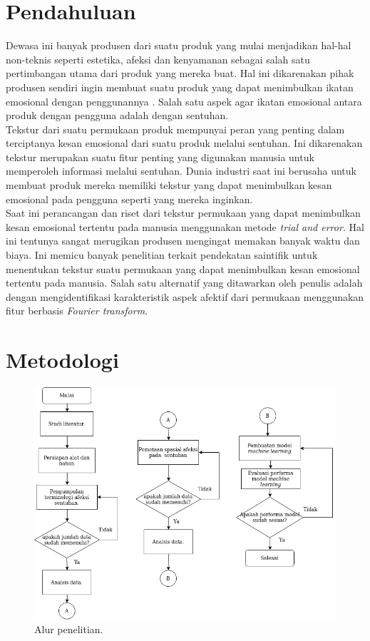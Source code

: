 \documentclass{Jurnal_kolo}
\begin{document}
\setlength{\columnsep}{1cm}
\begin{multicols}{2}
	\section{Pendahuluan}
	Dewasa ini banyak produsen dari suatu produk yang mulai menjadikan hal-hal non-teknis seperti estetika, afeksi dan kenyamanan sebagai salah satu pertimbangan utama dari produk yang mereka buat. Hal ini dikarenakan pihak produsen sendiri ingin membuat suatu produk yang dapat menimbulkan ikatan emosional dengan penggunannya \cite{Bahn2009}\cite{Khalid2006}. Salah satu aspek agar ikatan emosional antara produk dengan pengguna adalah dengan sentuhan.\\
	\indent Tekstur dari suatu permukaan produk mempunyai peran yang penting dalam terciptanya kesan emosional dari suatu produk melalui sentuhan. Ini dikarenakan tekstur merupakan suatu fitur penting yang digunakan manusia untuk memperoleh informasi melalui sentuhan. Dunia industri saat ini berusaha untuk membuat produk mereka memiliki tekstur yang dapat menimbulkan kesan emosional pada pengguna seperti yang mereka inginkan. \\
	\indent Saat ini perancangan dan riset dari tekstur permukaan yang dapat menimbulkan kesan emosional tertentu pada manusia menggunakan metode \emph{trial and error}. Hal ini tentunya sangat merugikan produsen mengingat memakan banyak waktu dan biaya. Ini memicu banyak penelitian terkait pendekatan saintifik untuk menentukan tekstur suatu permukaan yang dapat menimbulkan kesan emosional tertentu pada manusia. Salah satu alternatif yang ditawarkan oleh penulis adalah dengan mengidentifikasi karakteristik aspek afektif dari permukaan menggunakan fitur berbasis \emph{Fourier transform}. 
	\section{Metodologi}
	
	\begin{figure}[H]
		\centering
		\includegraphics[scale=0.3]{gambar/alurjurnal}
		\caption{Alur penelitian.}
		\label{alur}
	\end{figure} 
	

\end{multicols}
\end{document}
